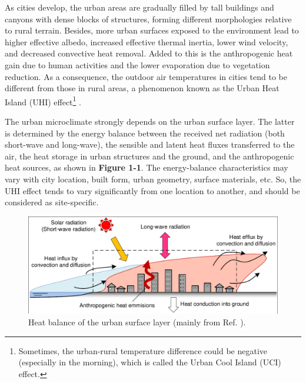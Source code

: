 As cities develop, the urban areas are gradually filled by tall buildings and canyons with dense blocks of structures, forming different morphologies relative to rural terrain. Besides, more urban surfaces exposed to the environment lead to higher effective albedo, increased effective thermal inertia, lower wind velocity, and decreased convective heat removal. Added to this is the anthropogenic heat gain due to human activities and the lower evaporation due to vegetation reduction. As a consequence, the outdoor air temperatures in cities tend to be different from those in rural areas, a phenomenon known as the Urban Heat Island (UHI) effect\footnote{Sometimes, the urban-rural temperature difference could be negative (especially in the morning), which is called the Urban Cool Island (UCI) effect.} \cite{oke1973city}.

The urban microclimate strongly depends on the urban surface layer. The latter is determined by the energy balance \cite{arnfield2003two, ooka2011thermal} between the received net radiation (both short-wave and long-wave), the sensible and latent heat fluxes transferred to the air, the heat storage in urban structures and the ground, and the anthropogenic heat sources, as shown in \textbf{Figure 1-1}. The energy-balance characteristics may vary \cite{salamanca2010new, grimmond1999heat} with city location, built form, urban geometry, surface materials, etc. So, the UHI effect tends to vary significantly from one location to another, and should be considered as site-specific.

\begin{figure}
\centering
\includegraphics[width=.85\linewidth,trim=2 2 2 2.5,clip]{UHI.pdf}
\caption{Heat balance of the urban surface layer (mainly from Ref. \cite{ooka2011thermal}).}
\end{figure}

